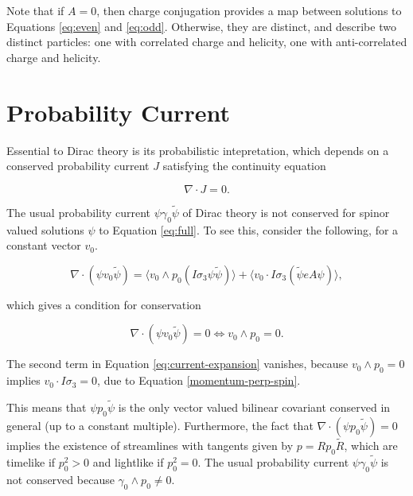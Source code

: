 \documentclass[twocolumn]{article}
\begin{document}
  Note that if $A = 0$, then charge conjugation provides a map between solutions to Equations \ref{eq:even} and \ref{eq:odd}. Otherwise, they are distinct, and describe two distinct particles: one with correlated charge and helicity, one with anti-correlated charge and helicity.

  \section{Probability Current}\label{probability}

  Essential to Dirac theory is its probabilistic intepretation, which depends on a conserved probability current $J$ satisfying the continuity equation

  \begin{equation}
    \nabla \cdot J = 0.
  \end{equation}

  The usual probability current $\psi \gamma_0 \widetilde \psi$ of Dirac theory is not conserved for spinor valued solutions $\psi$ to Equation \ref{eq:full}. To see this, consider the following, for a constant vector $v_0$.

  \begin{equation}
    \nabla \cdot (\psi v_0 \widetilde \psi) = \langle v_0 \wedge p_0 (I \sigma_3 \psi \widetilde \psi) \rangle + \langle v_0 \cdot I \sigma_3 (\widetilde \psi e A \psi) \rangle,\label{eq:current-expansion}
  \end{equation}

  which gives a condition for conservation

  \begin{equation}
    \nabla \cdot (\psi v_0 \widetilde \psi) = 0 \iff v_0 \wedge p_0 = 0.
  \end{equation}

  The second term in Equation \ref{eq:current-expansion} vanishes, because $v_0 \wedge p_0 = 0$ implies $v_0 \cdot I \sigma_3 = 0$, due to Equation \ref{momentum-perp-spin}.

  This means that $\psi p_0 \widetilde \psi$ is the only vector valued bilinear covariant conserved in general (up to a constant multiple). Furthermore, the fact that $\nabla \cdot (\psi p_0 \widetilde \psi) = 0$ implies the existence of streamlines with tangents given by $p = R p_0 \widetilde R$, which are timelike if $p_0^2 > 0$ and lightlike if $p_0^2 = 0$.\cite{hestenes} The usual probability current $\psi \gamma_0 \widetilde \psi$ is not conserved because $\gamma_0 \wedge p_0 \not= 0$.
\end{document}
